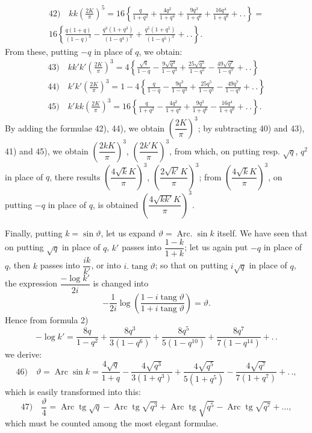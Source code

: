 \documentclass{article}
\begin{document}
\[
\begin{gathered}
\text{42)}\quad kk\left(\frac{2K}{\pi}\right)^{5}=16\left\{\frac{q}{1+q^{2}}+\frac{4q^{2}}{1+q^{4}}+\frac{9q^{3}}{1+q^{6}}+\frac{16q^{4}}{1+q^{8}}+.\,.\right\}=\\[2ex]
16\left\{\frac{q(1+q)}{(1-q)^{3}}-\frac{q^{3}(1+q^{3})}{(1-q^{3})^{3}}+\frac{q^{5}(1+q^{5})}{(1-q^{5})^{3}}+.\,.\right\}.
\end{gathered}
\]
From these, putting $-q$ in place of $q$, we obtain:
\[
\begin{gathered}
\text{43)}\quad kk'k'\left(\frac{2K}{\pi}\right)^{3}=4\left\{\frac{\sqrt{q}}{1-q}-\frac{9\sqrt{q^{3}}}{1-q^{3}}+\frac{25\sqrt{q^{5}}}{1-q^{5}}-\frac{49\sqrt{q^{7}}}{1-q^{7}}+.\,.\right\}\\[2ex]
\text{44)}\quad k'k'\left(\frac{2K}{\pi}\right)^{3}=1-4\left\{\frac{q}{1-q}-\frac{9q^{3}}{1-q^{3}}+\frac{25q^{5}}{1-q^{5}}-\frac{49q^{7}}{1-q^{7}}+.\,.\right\}\\[2ex]
\text{45)}\quad k'kk\left(\frac{2K}{\pi}\right)^{3}=16\left\{\frac{q}{1+q^{2}}-\frac{4q^{2}}{1+q^{4}}+\frac{9q^{3}}{1+q^{6}}-\frac{16q^{4}}{1+q^{8}}+.\,.\right\}.
\end{gathered}
\]
By adding the formulae 42), 44), we obtain $\left(\dfrac{2K}{\pi}\right)^{3}$; by subtracting 40) and 43), 41) and 45), we obtain $\left(\dfrac{2kK}{\pi}\right)^{3}$, $\left(\dfrac{2k'K}{\pi}\right)^{3}$, from which, on putting resp. $\sqrt{q}$, $q^{2}$ in place of $q$, there results $\left(\dfrac{4\sqrt{k}K}{\pi}\right)^{3}$, $\left(\dfrac{2\sqrt{k'}K}{\pi}\right)^{3}$; from $\left(\dfrac{4\sqrt{k}K}{\pi}\right)^{3}$, on putting $-q$ in place of $q$, is obtained $\left(\dfrac{4\sqrt{kk'}K}{\pi}\right)^{3}$.

Finally, putting $k=\sin\vartheta$, let us expand $\vartheta=\operatorname{Arc.}\sin k$ itself. We have seen that on putting $\sqrt{q}$ in place of $q$, $k'$ passes into $\dfrac{1-k}{1+k}$; let us again put $-q$ in place of $q$, then $k$ passes into $\dfrac{ik}{k'}$, or into $i.\operatorname{tang}\vartheta$; so that on putting $i\sqrt{q}$ in place of $q$, the expression $\dfrac{-\log k'}{2i}$ is changed into
\[
-\frac{1}{2i}\log\left(\frac{1-i\operatorname{tang}\vartheta}{1+i\operatorname{tang}\vartheta}\right)=\vartheta.
\]
Hence from formula 2)
\[
-\log k'=\frac{8q}{1-q^{2}}+\frac{8q^{3}}{3(1-q^{6})}+\frac{8q^{5}}{5(1-q^{10})}+\frac{8q^{7}}{7(1-q^{14})}+.\,.
\]
we derive:
\[
\text{46)}\quad\vartheta=\operatorname{Arc}\sin k=\frac{4\sqrt{q}}{1+q}-\frac{4\sqrt{q^{3}}}{3(1+q^{3})}+\frac{4\sqrt{q^{5}}}{5(1+q^{5})}-\frac{4\sqrt{q^{7}}}{7(1+q^{7})}+.\,.,
\]
which is easily transformed into this:
\[
\text{47)}\quad\frac{\vartheta}{4}=\operatorname{Arc}\operatorname{tg}\sqrt{q}-\operatorname{Arc}\operatorname{tg}\sqrt{q^{3}}+\operatorname{Arc}\operatorname{tg}\sqrt{q^{5}}-\operatorname{Arc}\operatorname{tg}\sqrt{q^{7}}+\ldots,
\]
which must be counted among the most elegant formulae.
\end{document}
